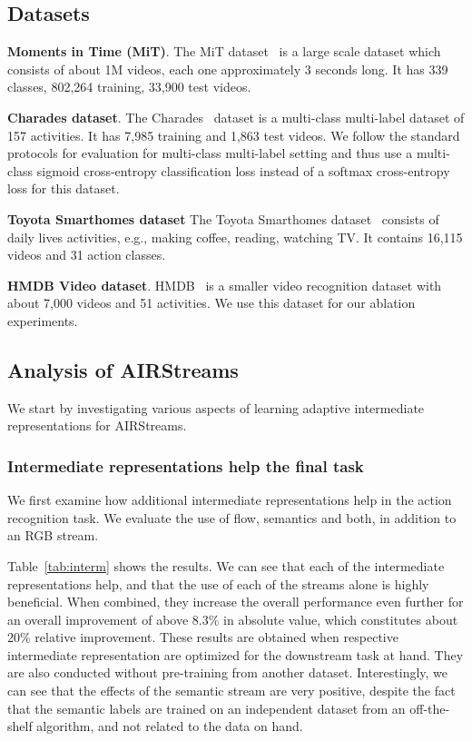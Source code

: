 \documentclass[final]{cvpr}
\begin{document}
\subsection{Datasets}

\noindent \textbf{Moments in Time (MiT)}. The MiT dataset~\cite{monfort2018moments} is a large scale dataset which consists of about 1M videos, each one approximately 3 seconds long. It has 339 classes,
802,264 training, 33,900 test videos.

\noindent \textbf{Charades dataset}. The Charades~\cite{sigurdsson2018charadesego} dataset is a multi-class multi-label dataset of 157 activities. It has 7,985 training and 1,863 test videos. We follow the standard protocols for evaluation for multi-class multi-label setting and thus use a multi-class sigmoid cross-entropy classification loss instead of a softmax cross-entropy loss for this dataset. 

\noindent \textbf{Toyota Smarthomes dataset} The Toyota Smarthomes dataset~\cite{das2019toyota} consists of daily lives activities, e.g., making coffee, reading, watching TV. It contains 16,115 videos and 31 action classes. 

\noindent \textbf{HMDB Video dataset}. HMDB~\cite{kuehne2011hmdb} is a smaller video recognition dataset with about 7,000 videos and 51 activities.
We use this dataset for our ablation experiments.



\subsection{Analysis of AIRStreams}
We start by investigating various aspects of learning adaptive intermediate representations for AIRStreams.

\vspace{-0.3cm}
\subsubsection{Intermediate representations help the final task}

We first examine how additional intermediate representations help in the action recognition task. We evaluate the use of flow, semantics and both, in addition to an RGB stream.

Table~\ref{tab:interm} shows the results. We can see that each of the intermediate representations help, and that the use of each of the streams alone is highly beneficial. When combined, they increase the overall performance even further for an overall improvement of above 8.3\% in absolute value, which constitutes about 20\% relative improvement.
These results are obtained when respective intermediate representation are optimized for the downstream task at hand. They are also conducted without pre-training from another dataset.
Interestingly, we can see that the effects of the semantic stream are very positive, despite the fact that the semantic labels are trained on an independent dataset from an off-the-shelf algorithm, and not related to the data on hand.
\end{document}
